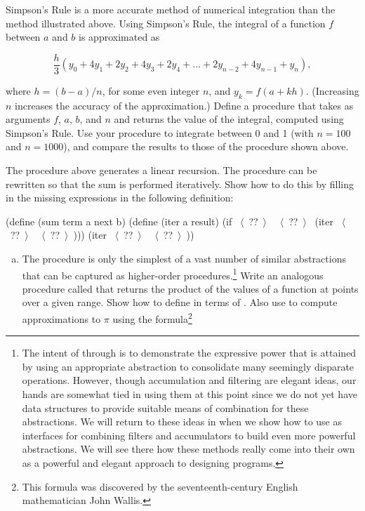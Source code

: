 \begin{exerciseGroup}
\label{Exercise 1.29}
 Simpson's Rule is a more accurate
method of numerical integration than the method illustrated above.  Using
Simpson's Rule, the integral of a function \( f \) between \( a \) and \( b \) is
approximated as

$$ \frac{h}{3}(y_0 + 4y_1 + 2y_2 + 4y_3 + 2y_4 + \dots + 2y_{n-2} + 4y_{n-1} + y_n), $$

\noindent
where \( h = (b - a) / n \), for some even integer \( n \), and
\( y_k = f(a + kh) \).  (Increasing \( n \) increases the
accuracy of the approximation.)  Define a procedure that takes as arguments
\( f \), \( a \), \( b \), and \( n \) and returns the value of the integral, computed
using Simpson's Rule.  Use your procedure to integrate  between 0
and 1 (with \( n = 100 \) and \( n = 1000 \)), and compare the results to those of
the  procedure shown above.

\label{Exercise 1.30}
 The  procedure above
generates a linear recursion.  The procedure can be rewritten so that the sum
is performed iteratively.  Show how to do this by filling in the missing
expressions in the following definition:

\begin{codeBlock}
(define (sum term a next b)
  (define (iter a result)
    (if ~\(\langle \)~??~\(\rangle \)~
        ~\(\langle \)~??~\(\rangle \)~
        (iter ~\(\langle \)~??~\(\rangle \)~ ~\(\langle \)~??~\(\rangle \)~)))
  (iter ~\(\langle \)~??~\(\rangle \)~ ~\(\langle \)~??~\(\rangle \)~))
\end{codeBlock}

\label{Exercise 1.31}
 \begin{enumerate}[a.]
\item
The  procedure is only the simplest of a vast number of similar
abstractions that can be captured as higher-order procedures.\footnote{The
intent of  through  is to demonstrate the
expressive power that is attained by using an appropriate abstraction to
consolidate many seemingly disparate operations.  However, though accumulation
and filtering are elegant ideas, our hands are somewhat tied in using them at
this point since we do not yet have data structures to provide suitable means
of combination for these abstractions.  We will return to these ideas in
 when we show how to use  as interfaces
for combining filters and accumulators to build even more powerful
abstractions.  We will see there how these methods really come into their own
as a powerful and elegant approach to designing programs.}  Write an analogous
procedure called  that returns the product of the values of a
function at points over a given range.  Show how to define  in
terms of .  Also use  to compute approximations to
\( \pi \) using the formula\footnote{This formula was discovered by the
seventeenth-century English mathematician John Wallis.}


\end{enumerate}
\end{exerciseGroup}
